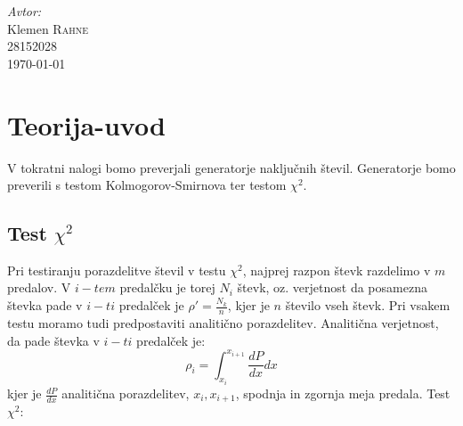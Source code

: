\documentclass[slovene,11pt,a4paper]{article}
\numberwithin{equation}{section} %
\numberwithin{figure}{section} %
\numberwithin{table}{section} %
\begin{document}
\begin{titlepage}



\Large \emph{Avtor:}\\
Klemen \textsc{Rahne}\\
28152028\\[2cm]

{\large \today } \\[0.5cm] %

	

\end{titlepage}




\section{Teorija-uvod}
V tokratni nalogi bomo preverjali generatorje naključnih števil. Generatorje bomo preverili s testom Kolmogorov-Smirnova ter testom $\chi^2$.

\subsection{Test $\chi^2$}

Pri testiranju porazdelitve števil v testu $\chi^2$, najprej razpon števk razdelimo v $m$ predalov. V $i-tem$ predalčku je torej $N_i$ števk, oz. verjetnost da posamezna števka pade v $i-ti$ predalček je $\rho' =\frac{N_k}{n}$, kjer je $n$ število vseh števk. Pri vsakem testu moramo tudi predpostaviti analitično porazdelitev. Analitična verjetnost, da pade števka v $i-ti$ predalček je:
\begin{equation}
\rho_i = \int_{x_i}^{x_{i+1}} \frac{dP}{dx} dx
\end{equation}
kjer je $\frac{dP}{dx}$ analitična porazdelitev, $x_i, x_{i+1}$, spodnja in zgornja meja predala. Test $\chi^2$:
\end{document}
